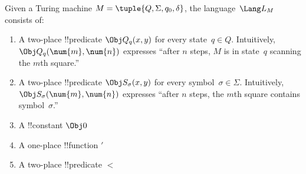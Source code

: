 \documentclass[../../../include/open-logic-section]{subfiles}
\begin{document}
\begin{defn}
Given a Turing machine $M = \tuple{Q, \Sigma, q_0, \delta}$, the
language~$\Lang L_M$ consists of:
\begin{enumerate}
\item A two-place !!{predicate} $\Obj Q_q(x, y)$ for every state~$q \in
  Q$.  Intuitively, $\Obj Q_q(\num{m}, \num{n})$ expresses ``after $n$
  steps, $M$ is in state~$q$ scanning the $m$th square.''
\item A two-place !!{predicate} $\Obj S_\sigma(x, y)$ for every
  symbol~$\sigma\in \Sigma$.  Intuitively, $\Obj S_\sigma(\num{m},
  \num{n})$ expresses ``after $n$ steps, the $m$th square contains
  symbol~$\sigma$.''
\item A !!{constant} $\Obj 0$
\item A one-place !!{function} $\prime$
\item A two-place !!{predicate} $<$
\end{enumerate}
\end{defn}
\end{document}
